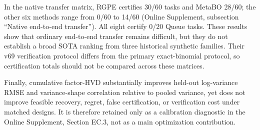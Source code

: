 In the native transfer matrix, RGPE certifies 30/60 tasks and MetaBO 28/60;
the other six methods range from 0/60 to 14/60 (Online Supplement,
subsection ``Native end-to-end transfer'').  All eight certify 0/20 Queue tasks.  These
results show that ordinary end-to-end transfer remains difficult, but they do
not establish a broad SOTA ranking from three historical synthetic families.
Their v69 verification protocol differs from the primary exact-binomial
protocol, so certification totals should not be compared across these matrices.

Finally, cumulative factor-HVD substantially improves held-out log-variance
RMSE and variance-shape correlation relative to pooled variance, yet does not
improve feasible recovery, regret, false certification, or verification cost
under matched designs.  It is therefore retained only as a calibration
diagnostic in the Online Supplement, Section EC.3, not as a main optimization
contribution.
